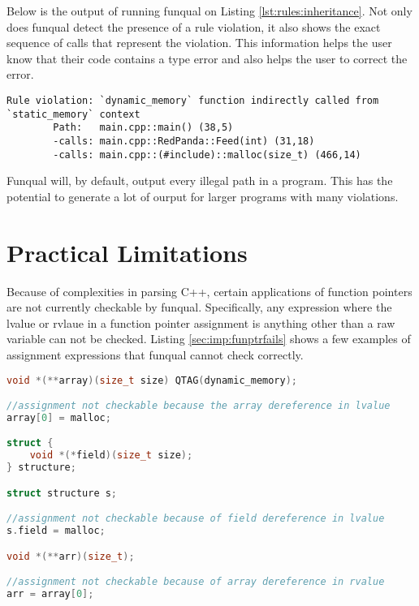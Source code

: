Below is the output of running funqual on Listing \ref{lst:rules:inheritance}.  Not only does funqual detect the presence of a rule violation, it also shows the exact sequence of calls that represent the violation.  This information helps the user know that their code contains a type error and also helps the user to correct the error.

\noindent\begin{minipage}[t]{\linewidth}
\begin{lstlisting}
Rule violation: `dynamic_memory` function indirectly called from `static_memory` context
        Path:   main.cpp::main() (38,5)
        -calls: main.cpp::RedPanda::Feed(int) (31,18)
        -calls: main.cpp::(#include)::malloc(size_t) (466,14)
\end{lstlisting}
\end{minipage}

Funqual will, by default, output every illegal path in a program.  This has the potential to generate a lot of ourput for larger programs with many violations.  

\section{Practical Limitations}

Because of complexities in parsing C++, certain applications of function pointers are not currently checkable by funqual.  Specifically, any expression where the lvalue or rvlaue in a function pointer assignment is anything other than a raw variable can not be checked.  Listing \ref{sec:imp:funptrfails} shows a few examples of assignment expressions that funqual cannot check correctly.

\noindent\begin{minipage}[t]{\linewidth}
\begin{lstlisting}[language=c++,label={sec:imp:funptrfails},caption={Examples of function pointer assignment expressions that are not checked correctly by funqual}]
void *(**array)(size_t size) QTAG(dynamic_memory);

//assignment not checkable because the array dereference in lvalue
array[0] = malloc;

struct {
    void *(*field)(size_t size);
} structure;

struct structure s;

//assignment not checkable because of field dereference in lvalue
s.field = malloc;

void *(**arr)(size_t);

//assignment not checkable because of array dereference in rvalue
arr = array[0];
\end{lstlisting}
\end{minipage}

